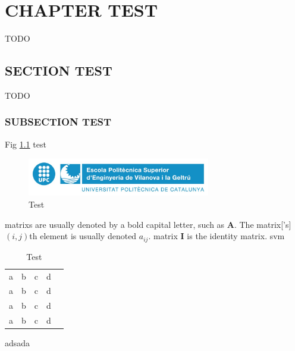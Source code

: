 \newpage
\pagestyle{plain}

\chapter{CHAPTER TEST}

TODO
\section{SECTION TEST}

TODO

\subsection{SUBSECTION TEST}

Fig \ref{fig:test} test

\begin{figure}[h]
    \includegraphics[width=8cm]{media/epsevg_logo}
    \centering
    \caption{Test}
    \label{fig:test}
\end{figure}

\Glspl{matrix} are usually denoted by a bold capital letter, such as $\mathbf{A}$. The \gls{matrix}['s] $(i,j)$th element is usually denoted $a_{ij}$. \Gls{matrix} $\mathbf{I}$ is the identity \gls{matrix}. 
\gls{svm}

\begin{table}[]
\centering
\begin{tabular}{lllll}
  a  & b & c & d &  \\
  a  & b & c & d &  \\
  a  & b & c & d &  \\
  a  & b & c & d & 
\end{tabular}
\caption{Test}
\label{table:test}
\end{table}

adsada \cite{texbook}
